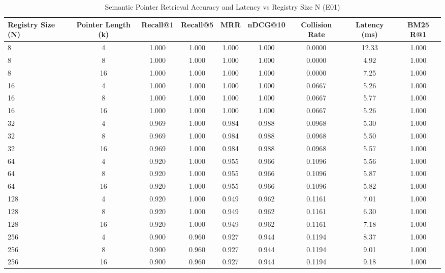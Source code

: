 \begin{table}
\caption{Semantic Pointer Retrieval Accuracy and Latency vs Registry Size N (E01)}
\label{tab:retrieval}
\begin{tabular}{lcccccccc}
\toprule
Registry Size (N) & Pointer Length (k) & Recall@1 & Recall@5 & MRR & nDCG@10 & Collision Rate & Latency (ms) & BM25 R@1 \\
\midrule
8 & 4 & 1.000 & 1.000 & 1.000 & 1.000 & 0.0000 & 12.33 & 1.000 \\
8 & 8 & 1.000 & 1.000 & 1.000 & 1.000 & 0.0000 & 4.92 & 1.000 \\
8 & 16 & 1.000 & 1.000 & 1.000 & 1.000 & 0.0000 & 7.25 & 1.000 \\
16 & 4 & 1.000 & 1.000 & 1.000 & 1.000 & 0.0667 & 5.26 & 1.000 \\
16 & 8 & 1.000 & 1.000 & 1.000 & 1.000 & 0.0667 & 5.77 & 1.000 \\
16 & 16 & 1.000 & 1.000 & 1.000 & 1.000 & 0.0667 & 5.26 & 1.000 \\
32 & 4 & 0.969 & 1.000 & 0.984 & 0.988 & 0.0968 & 5.30 & 1.000 \\
32 & 8 & 0.969 & 1.000 & 0.984 & 0.988 & 0.0968 & 5.50 & 1.000 \\
32 & 16 & 0.969 & 1.000 & 0.984 & 0.988 & 0.0968 & 5.57 & 1.000 \\
64 & 4 & 0.920 & 1.000 & 0.955 & 0.966 & 0.1096 & 5.56 & 1.000 \\
64 & 8 & 0.920 & 1.000 & 0.955 & 0.966 & 0.1096 & 5.87 & 1.000 \\
64 & 16 & 0.920 & 1.000 & 0.955 & 0.966 & 0.1096 & 5.82 & 1.000 \\
128 & 4 & 0.920 & 1.000 & 0.949 & 0.962 & 0.1161 & 7.01 & 1.000 \\
128 & 8 & 0.920 & 1.000 & 0.949 & 0.962 & 0.1161 & 6.30 & 1.000 \\
128 & 16 & 0.920 & 1.000 & 0.949 & 0.962 & 0.1161 & 7.18 & 1.000 \\
256 & 4 & 0.900 & 0.960 & 0.927 & 0.944 & 0.1194 & 8.37 & 1.000 \\
256 & 8 & 0.900 & 0.960 & 0.927 & 0.944 & 0.1194 & 9.01 & 1.000 \\
256 & 16 & 0.900 & 0.960 & 0.927 & 0.944 & 0.1194 & 9.18 & 1.000 \\
\bottomrule
\end{tabular}
\end{table}
